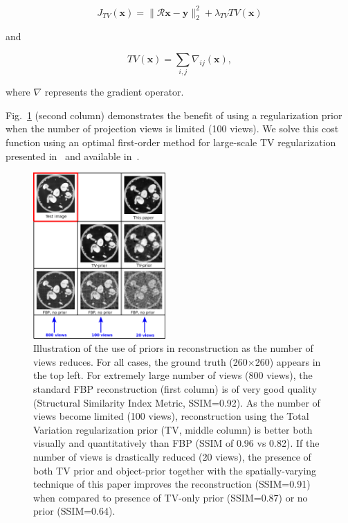 \documentclass[journal]{IEEEtran}
\begin{document}
 \begin{equation}
   J_{TV}(\boldsymbol{x}) = \lVert\boldsymbol{\mathcal{R}x}- \boldsymbol{y}\rVert_2^2 + \lambda_{TV}TV(\boldsymbol{x})
   \label{Eq:simple_TV}
 \end{equation}

 and 

  \begin{equation}
   TV(\boldsymbol{x}) = \sum_{i,j}\nabla_{ij}(\boldsymbol{x}),
   \label{Eq:definition_TV}
\end{equation}

  where $\nabla$ represents the gradient operator.
  
 Fig.~\ref{fig:story} (second column) demonstrates the benefit of
 using a regularization prior when the number of projection views is
 limited (100 views).  We solve this cost function using an optimal
 first-order method for large-scale TV regularization presented
 in~\cite{TVReg} and available in~\cite{TVReg-lib}.


 \begin{figure}[t]
\centering
	\includegraphics[width=0.45\textwidth]{../images/story/post_TCI/story.png}
        \caption{Illustration of the use of priors in reconstruction
          as the number of views reduces. For all cases, the ground
          truth (260$\times$260) appears in the top left.  For
          extremely large number of views (800 views), the standard
          FBP reconstruction (first column) is of very good quality
          (Structural Similarity Index Metric, SSIM=0.92). As the
          number of views become limited (100 views), reconstruction
          using the Total Variation regularization prior (TV, middle
          column) is better both visually and quantitatively than FBP
          (SSIM of 0.96 vs 0.82). If the number of views is
          drastically reduced (20 views), the presence of both TV
          prior and object-prior together with the spatially-varying
          technique of this paper improves the reconstruction
          (SSIM=0.91) when compared to presence of TV-only prior
          (SSIM=0.87) or no prior (SSIM=0.64).}
 \label{fig:story}
 \end{figure} 
\end{document}
